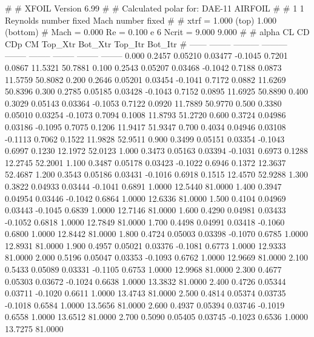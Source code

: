 #  
#       XFOIL         Version 6.99
#  
# Calculated polar for: DAE-11 AIRFOIL                                  
#  
# 1 1 Reynolds number fixed          Mach number fixed         
#  
# xtrf =   1.000 (top)        1.000 (bottom)  
# Mach =   0.000     Re =     0.100 e 6     Ncrit =   9.000  9.000
#  
#   alpha    CL        CD       CDp       CM     Top_Xtr  Bot_Xtr  Top_Itr  Bot_Itr
#  ------ -------- --------- --------- -------- -------- -------- -------- --------
   0.000   0.2457   0.05210   0.03477  -0.1045   0.7201   0.0867  11.5321  50.7881
   0.100   0.2543   0.05207   0.03468  -0.1042   0.7188   0.0873  11.5759  50.8082
   0.200   0.2646   0.05201   0.03454  -0.1041   0.7172   0.0882  11.6269  50.8396
   0.300   0.2785   0.05185   0.03428  -0.1043   0.7152   0.0895  11.6925  50.8890
   0.400   0.3029   0.05143   0.03364  -0.1053   0.7122   0.0920  11.7889  50.9770
   0.500   0.3380   0.05010   0.03254  -0.1073   0.7094   0.1008  11.8793  51.2720
   0.600   0.3724   0.04986   0.03186  -0.1095   0.7075   0.1206  11.9417  51.9347
   0.700   0.4034   0.04946   0.03108  -0.1113   0.7062   0.1522  11.9828  52.9511
   0.900   0.3499   0.05151   0.03354  -0.1043   0.6997   0.1230  12.1972  52.0123
   1.000   0.3473   0.05163   0.03394  -0.1031   0.6973   0.1288  12.2745  52.2001
   1.100   0.3487   0.05178   0.03423  -0.1022   0.6946   0.1372  12.3637  52.4687
   1.200   0.3543   0.05186   0.03431  -0.1016   0.6918   0.1515  12.4570  52.9288
   1.300   0.3822   0.04933   0.03444  -0.1041   0.6891   1.0000  12.5440  81.0000
   1.400   0.3947   0.04954   0.03446  -0.1042   0.6864   1.0000  12.6336  81.0000
   1.500   0.4104   0.04969   0.03443  -0.1045   0.6839   1.0000  12.7146  81.0000
   1.600   0.4290   0.04981   0.03433  -0.1052   0.6818   1.0000  12.7849  81.0000
   1.700   0.4498   0.04991   0.03418  -0.1060   0.6800   1.0000  12.8442  81.0000
   1.800   0.4724   0.05003   0.03398  -0.1070   0.6785   1.0000  12.8931  81.0000
   1.900   0.4957   0.05021   0.03376  -0.1081   0.6773   1.0000  12.9333  81.0000
   2.000   0.5196   0.05047   0.03353  -0.1093   0.6762   1.0000  12.9669  81.0000
   2.100   0.5433   0.05089   0.03331  -0.1105   0.6753   1.0000  12.9968  81.0000
   2.300   0.4677   0.05303   0.03672  -0.1024   0.6638   1.0000  13.3832  81.0000
   2.400   0.4726   0.05344   0.03711  -0.1020   0.6611   1.0000  13.4743  81.0000
   2.500   0.4814   0.05374   0.03735  -0.1018   0.6584   1.0000  13.5656  81.0000
   2.600   0.4937   0.05394   0.03746  -0.1019   0.6558   1.0000  13.6512  81.0000
   2.700   0.5090   0.05405   0.03745  -0.1023   0.6536   1.0000  13.7275  81.0000
